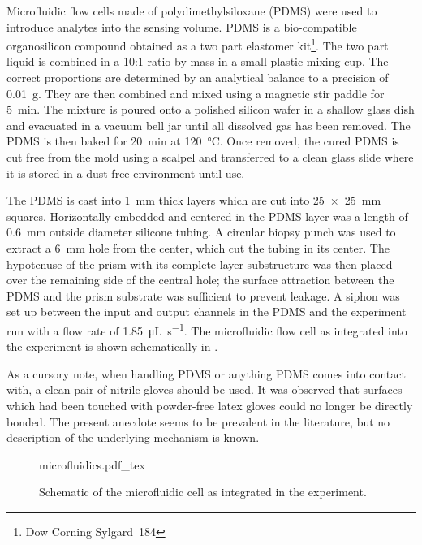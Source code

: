 Microfluidic flow cells made of polydimethylsiloxane (PDMS) were used to
introduce analytes into the sensing volume.  PDMS is a bio-compatible
organosilicon compound obtained as a two part elastomer kit\footnote{Dow
Corning Sylgard\textregistered~184}.  The two part liquid is combined in a
10:1 ratio by mass in a small plastic mixing cup.  The correct proportions
are determined by an analytical balance to a precision of \SI{0.01}{\gram}.
They are then combined and mixed using a magnetic stir paddle for
\SI{5}{\minute}.  The mixture is poured onto a polished silicon wafer in a
shallow glass dish and evacuated in a vacuum bell jar until all dissolved
gas has been removed.  The PDMS is then baked for \SI{20}{\minute} at
\SI{120}{\celsius}.  Once removed, the cured PDMS is cut free from the mold
using a scalpel and transferred to a clean glass slide where it is stored
in a dust free environment until use.

The PDMS is cast into \SI{1}{\milli\meter} thick layers which are cut into
\SI{25x25}{\milli\meter} squares.  Horizontally embedded and centered in the
PDMS layer was a length of \SI{0.6}{\milli\meter} outside diameter
silicone tubing.  A circular biopsy punch was used to extract a
\SI{6}{\milli\meter} hole from the center, which cut the tubing in its center.
The hypotenuse of the prism with its complete layer substructure was then
placed over the remaining side of the central hole; the surface attraction
between the PDMS and the prism substrate was sufficient to prevent leakage.  A
siphon was set up between the input and output channels in the PDMS and the
experiment run with a flow rate of \SI{1.85}{\micro\liter\per\second}.  The
microfluidic flow cell as integrated into the experiment is shown schematically
in .

As a cursory note, when handling PDMS or anything PDMS comes into contact
with, a clean pair of nitrile gloves should be used.  It was observed that
surfaces which had been touched with powder-free latex gloves could no
longer be directly bonded.  The present anecdote seems to be prevalent in
the literature, but no description of the underlying mechanism is known.

\begin{figure}[ht]
\centering
{microfluidics.pdf_tex}
\caption{Schematic of the microfluidic cell as integrated in the experiment.}
\label{fig:microfluidiccell}
\end{figure}
